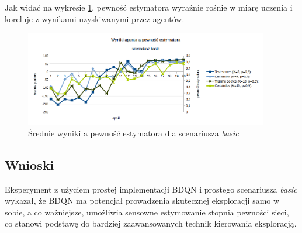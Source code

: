 Jak widać na wykresie \ref{fig:naive_bdqn_certainties}, pewność estymatora wyraźnie rośnie w miarę uczenia i koreluje z wynikami uzyskiwanymi przez agentów.

\begin{figure}[H]
    \centering
    \includegraphics[width=0.95\textwidth]{figures/figures/naive_bdqn_certainties.png}
    \caption{Średnie wyniki a pewność estymatora dla scenariusza \textit{basic}}
    \label{fig:naive_bdqn_certainties}
\end{figure}

\subsection{Wnioski}
Eksperyment z użyciem prostej implementacji BDQN i prostego scenariusza \textit{basic} wykazał, że BDQN ma potencjał prowadzenia skutecznej eksploracji samo w sobie, a co ważniejsze, umożliwia sensowne estymowanie stopnia pewności sieci, co stanowi podstawę do bardziej zaawansowanych technik kierowania eksploracją.
